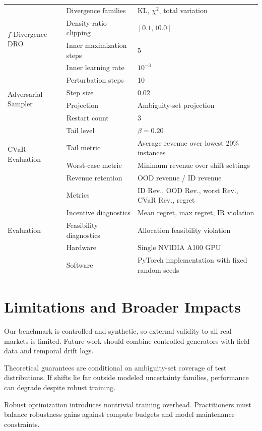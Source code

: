 \documentclass{article}
\begin{document}
\begin{table}[h]
{\begin{tabular}{lll}
\midrule
\multirow{4}{*}{$f$-Divergence DRO}
& Divergence families & KL, $\chi^2$, total variation \\
& Density-ratio clipping & $[0.1,10.0]$ \\
& Inner maximization steps & 5 \\
& Inner learning rate & $10^{-3}$ \\
\midrule
\multirow{4}{*}{Adversarial Sampler}
& Perturbation steps & 10 \\
& Step size & $0.02$ \\
& Projection & Ambiguity-set projection \\
& Restart count & 3 \\
\midrule
\multirow{4}{*}{CVaR Evaluation}
& Tail level & $\beta=0.20$ \\
& Tail metric & Average revenue over lowest 20\% instances \\
& Worst-case metric & Minimum revenue over shift settings \\
& Revenue retention & OOD revenue / ID revenue \\
\midrule
\multirow{5}{*}{Evaluation}
& Metrics & ID Rev., OOD Rev., worst Rev., CVaR Rev., regret \\
& Incentive diagnostics & Mean regret, max regret, IR violation \\
& Feasibility diagnostics & Allocation feasibility violation \\
& Hardware & Single NVIDIA A100 GPU \\
& Software & PyTorch implementation with fixed random seeds \\
\bottomrule
\end{tabular}
}
\end{table}


\section{Limitations and Broader Impacts}
Our benchmark is controlled and synthetic, so external validity to all real markets is limited. Future work should combine controlled generators with field data and temporal drift logs.

Theoretical guarantees are conditional on ambiguity-set coverage of test distributions. If shifts lie far outside modeled uncertainty families, performance can degrade despite robust training.

Robust optimization introduces nontrivial training overhead. Practitioners must balance robustness gains against compute budgets and model maintenance constraints.
\end{document}
